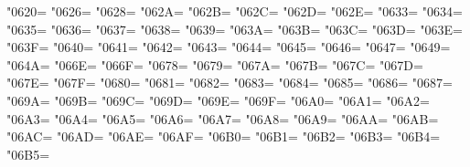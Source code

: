 \XeTeXcharclass"0620=\KclassArabD
\XeTeXcharclass"0626=\KclassArabD
\XeTeXcharclass"0628=\KclassArabD
\XeTeXcharclass"062A=\KclassArabD
\XeTeXcharclass"062B=\KclassArabD
\XeTeXcharclass"062C=\KclassArabD
\XeTeXcharclass"062D=\KclassArabD
\XeTeXcharclass"062E=\KclassArabD
\XeTeXcharclass"0633=\KclassArabD
\XeTeXcharclass"0634=\KclassArabD
\XeTeXcharclass"0635=\KclassArabD
\XeTeXcharclass"0636=\KclassArabD
\XeTeXcharclass"0637=\KclassArabD
\XeTeXcharclass"0638=\KclassArabD
\XeTeXcharclass"0639=\KclassArabD
\XeTeXcharclass"063A=\KclassArabD
\XeTeXcharclass"063B=\KclassArabD
\XeTeXcharclass"063C=\KclassArabD
\XeTeXcharclass"063D=\KclassArabD
\XeTeXcharclass"063E=\KclassArabD
\XeTeXcharclass"063F=\KclassArabD
\XeTeXcharclass"0640=\KclassArabD
\XeTeXcharclass"0641=\KclassArabD
\XeTeXcharclass"0642=\KclassArabD
\XeTeXcharclass"0643=\KclassArabD
\XeTeXcharclass"0644=\KclassArabD
\XeTeXcharclass"0645=\KclassArabD
\XeTeXcharclass"0646=\KclassArabD
\XeTeXcharclass"0647=\KclassArabD
\XeTeXcharclass"0649=\KclassArabD
\XeTeXcharclass"064A=\KclassArabD
\XeTeXcharclass"066E=\KclassArabD
\XeTeXcharclass"066F=\KclassArabD
\XeTeXcharclass"0678=\KclassArabD
\XeTeXcharclass"0679=\KclassArabD
\XeTeXcharclass"067A=\KclassArabD
\XeTeXcharclass"067B=\KclassArabD
\XeTeXcharclass"067C=\KclassArabD
\XeTeXcharclass"067D=\KclassArabD
\XeTeXcharclass"067E=\KclassArabD
\XeTeXcharclass"067F=\KclassArabD
\XeTeXcharclass"0680=\KclassArabD
\XeTeXcharclass"0681=\KclassArabD
\XeTeXcharclass"0682=\KclassArabD
\XeTeXcharclass"0683=\KclassArabD
\XeTeXcharclass"0684=\KclassArabD
\XeTeXcharclass"0685=\KclassArabD
\XeTeXcharclass"0686=\KclassArabD
\XeTeXcharclass"0687=\KclassArabD
\XeTeXcharclass"069A=\KclassArabD
\XeTeXcharclass"069B=\KclassArabD
\XeTeXcharclass"069C=\KclassArabD
\XeTeXcharclass"069D=\KclassArabD
\XeTeXcharclass"069E=\KclassArabD
\XeTeXcharclass"069F=\KclassArabD
\XeTeXcharclass"06A0=\KclassArabD
\XeTeXcharclass"06A1=\KclassArabD
\XeTeXcharclass"06A2=\KclassArabD
\XeTeXcharclass"06A3=\KclassArabD
\XeTeXcharclass"06A4=\KclassArabD
\XeTeXcharclass"06A5=\KclassArabD
\XeTeXcharclass"06A6=\KclassArabD
\XeTeXcharclass"06A7=\KclassArabD
\XeTeXcharclass"06A8=\KclassArabD
\XeTeXcharclass"06A9=\KclassArabD
\XeTeXcharclass"06AA=\KclassArabD
\XeTeXcharclass"06AB=\KclassArabD
\XeTeXcharclass"06AC=\KclassArabD
\XeTeXcharclass"06AD=\KclassArabD
\XeTeXcharclass"06AE=\KclassArabD
\XeTeXcharclass"06AF=\KclassArabD
\XeTeXcharclass"06B0=\KclassArabD
\XeTeXcharclass"06B1=\KclassArabD
\XeTeXcharclass"06B2=\KclassArabD
\XeTeXcharclass"06B3=\KclassArabD
\XeTeXcharclass"06B4=\KclassArabD
\XeTeXcharclass"06B5=\KclassArabD
